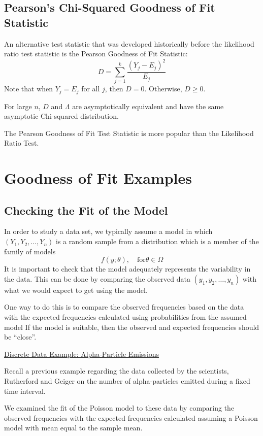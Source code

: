 \subsection{Pearson's Chi-Squared Goodness of Fit Statistic}

An alternative test statistic that was developed historically before the likelihood ratio
test statistic is the Pearson Goodness of Fit Statistic:
\[
    D=\sum_{j=1}^{k} \frac{\left(Y_{j}-E_{j}\right)^{2}}{E_{j}}
\]
Note that when $Y_{j}=E_{j}$ for all $j$, then $D=0$.
Otherwise, $D \geq 0$.

For large $ n $, $ D $ and $ \Lambda $ are asymptotically equivalent and have the
same asymptotic Chi-squared distribution.

The Pearson Goodness of Fit Test Statistic is more popular than the Likelihood Ratio Test.

\section{Goodness of Fit Examples}
\subsection{Checking the Fit of the Model}
In order to study a data set, we typically assume a model in which $\left(Y_{1}, Y_{2}, \ldots, Y_{n}\right)$ is a random sample from a distribution which is a member of the family of models
\[
    f(y ; \theta), \quad \text{for} \theta \in \Omega
\]
It is important to check that the model adequately represents the variability in the data.
This can be done by comparing the observed data $\left(y_{1}, y_{2}, \ldots, y_{n}\right)$ with what we would expect to get using the model.

One way to do this is to compare the observed frequencies based on the data with the expected frequencies calculated using probabilities from the assumed model
If the model is suitable, then the observed and expected frequencies should be ``close''.

\underline{Discrete Data Example: Alpha-Particle Emissions}

Recall a previous example regarding the data collected by the scientists, Rutherford and Geiger on the number of alpha-particles emitted during a fixed time interval.

We examined the fit of the Poisson model to these data by comparing the observed frequencies with the expected frequencies calculated assuming a Poisson model with mean equal to the sample mean.

